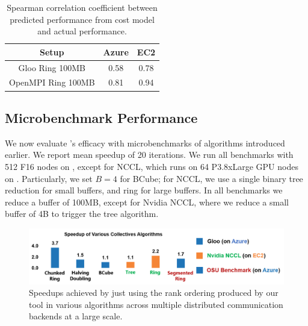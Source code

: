 \begin{table}[t!]
	\centering
	\footnotesize
	\begin{tabular}{|c|c|c|}
		\hline 
	    Setup & Azure & EC2  \\
		\hline
		Gloo Ring 100MB      & 0.58 & 0.78  \\
		\hline
		OpenMPI Ring 100MB      & 0.81 & 0.94 \\
		\hline
	\end{tabular}
	\caption{Spearman correlation coefficient between predicted performance from cost model and actual performance.}
	\label{table:correlation}
\end{table}


\subsection{Microbenchmark Performance}
We now evaluate \cmpi{}'s efficacy with microbenchmarks of \mpi algorithms introduced earlier. We report mean speedup of 20 iterations. We run all benchmarks with 512 F16 nodes on \azure, except for NCCL, which runs on 64 P3.8xLarge GPU nodes on \ectwo. Particularly, we set $B=4$ for BCube; for NCCL, we use a single binary tree reduction for small buffers, and ring for large buffers. In all benchmarks we reduce a buffer of 100MB, except for Nvidia NCCL, where we reduce a small buffer of 4B to trigger the tree algorithm.


\begin{figure}[t!]
	\centering
	\includegraphics[width=.6\linewidth]{Figures/collectivesperformance.png}
	\caption{Speedups achieved by just using the rank ordering produced by our tool in various \collectives algorithms across multiple distributed communication backends at a large scale.}
	\label{fig:collectivesPerformance}
\end{figure}

